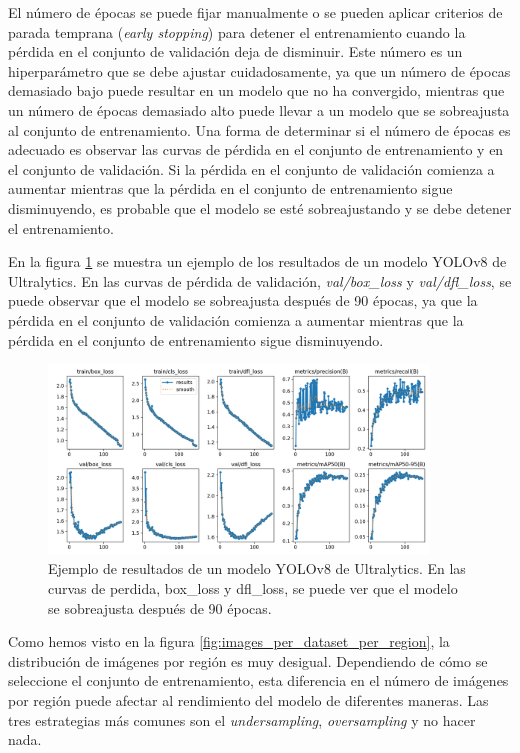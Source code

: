 El número de épocas se puede fijar manualmente o se pueden aplicar criterios de parada temprana (\textit{early stopping}) para detener el entrenamiento cuando la pérdida en el conjunto de validación deja de disminuir. Este número es un hiperparámetro que se debe ajustar cuidadosamente, ya que un número de épocas demasiado bajo puede resultar en un modelo que no ha convergido, mientras que un número de épocas demasiado alto puede llevar a un modelo que se sobreajusta al conjunto de entrenamiento. Una forma de determinar si el número de épocas es adecuado es observar las curvas de pérdida en el conjunto de entrenamiento y en el conjunto de validación. Si la pérdida en el conjunto de validación comienza a aumentar mientras que la pérdida en el conjunto de entrenamiento sigue disminuyendo, es probable que el modelo se esté sobreajustando y se debe detener el entrenamiento.

En la figura \ref{fig:example_results} se muestra un ejemplo de los resultados de un modelo YOLOv8 de Ultralytics. En las curvas de pérdida de validación, \textit{val/box\_loss} y \textit{val/dfl\_loss}, se puede observar que el modelo se sobreajusta después de 90 épocas, ya que la pérdida en el conjunto de validación comienza a aumentar mientras que la pérdida en el conjunto de entrenamiento sigue disminuyendo.

\begin{figure}[H]
    \centering
    \includegraphics[width=0.9\textwidth]{graphs/example_results.png}
    \caption{Ejemplo de resultados de un modelo YOLOv8 de Ultralytics. En las curvas de perdida, box\_loss y dfl\_loss, se puede ver que el modelo se sobreajusta después de 90 épocas.}
    \label{fig:example_results}
\end{figure}

Como hemos visto en la figura \ref{fig:images_per_dataset_per_region}, la distribución de imágenes por región es muy desigual. Dependiendo de cómo se seleccione el conjunto de entrenamiento, esta diferencia en el número de imágenes por región puede afectar al rendimiento del modelo de diferentes maneras. Las tres estrategias más comunes son el \textit{undersampling}, \textit{oversampling} y no hacer nada.

